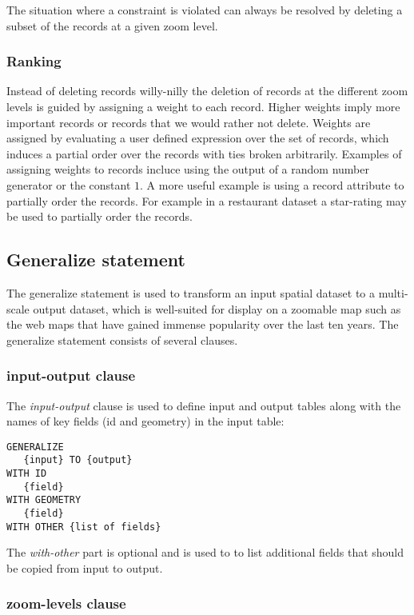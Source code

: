 The situation where a constraint is violated can always be resolved by deleting a subset of the records at a given zoom level.

\subsubsection{Ranking}
Instead of deleting records willy-nilly the deletion of records at the different zoom levels is guided by assigning a weight to each record. Higher weights imply more important records or records that we would rather not delete. Weights are assigned by evaluating a user defined expression over the set of records, which induces a partial order over the records with ties broken arbitrarily. Examples of assigning weights to records incluce using the output of a random number generator or the constant $1$. A more useful example is using a record attribute to partially order the records. For example in a restaurant dataset a star-rating may be used to partially order the records.

\subsection{Generalize statement}
The generalize statement is used to transform an input spatial dataset to a multi-scale output dataset, which is well-suited for display on a zoomable map such as the web maps that have gained immense popularity over the last ten years. The generalize statement consists of several clauses. 

\subsubsection{input-output clause}

The \emph{input-output} clause is used to define input and output tables along with the names of key fields (id and geometry) in the input table:

\begin{lstlisting}
GENERALIZE 
   {input} TO {output}
WITH ID
   {field}
WITH GEOMETRY 
   {field}
WITH OTHER {list of fields}
\end{lstlisting}

The \emph{with-other} part is optional and is used to to list additional fields that should be copied from input to output.

\subsubsection{zoom-levels clause}


